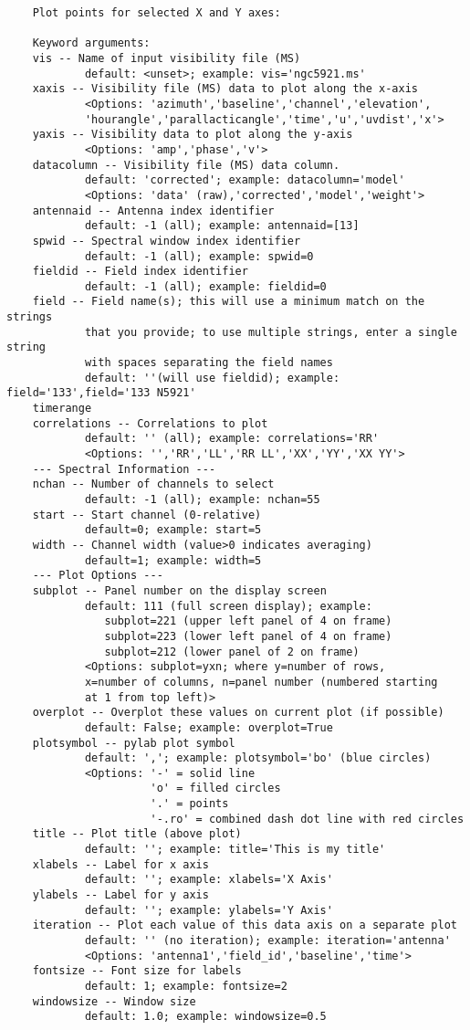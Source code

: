 \small
\begin{verbatim}
    Plot points for selected X and Y axes:
    
    Keyword arguments:
    vis -- Name of input visibility file (MS)
            default: <unset>; example: vis='ngc5921.ms'
    xaxis -- Visibility file (MS) data to plot along the x-axis
            <Options: 'azimuth','baseline','channel','elevation',
            'hourangle','parallacticangle','time','u','uvdist','x'>
    yaxis -- Visibility data to plot along the y-axis
            <Options: 'amp','phase','v'>
    datacolumn -- Visibility file (MS) data column.
            default: 'corrected'; example: datacolumn='model'
            <Options: 'data' (raw),'corrected','model','weight'>
    antennaid -- Antenna index identifier
            default: -1 (all); example: antennaid=[13]
    spwid -- Spectral window index identifier
            default: -1 (all); example: spwid=0
    fieldid -- Field index identifier
            default: -1 (all); example: fieldid=0
    field -- Field name(s); this will use a minimum match on the strings
            that you provide; to use multiple strings, enter a single string
            with spaces separating the field names
            default: ''(will use fieldid); example: field='133',field='133 N5921'
    timerange
    correlations -- Correlations to plot
            default: '' (all); example: correlations='RR'
            <Options: '','RR','LL','RR LL','XX','YY','XX YY'>
    --- Spectral Information ---
    nchan -- Number of channels to select
            default: -1 (all); example: nchan=55
    start -- Start channel (0-relative)
            default=0; example: start=5
    width -- Channel width (value>0 indicates averaging)
            default=1; example: width=5
    --- Plot Options ---
    subplot -- Panel number on the display screen
            default: 111 (full screen display); example:
               subplot=221 (upper left panel of 4 on frame)
               subplot=223 (lower left panel of 4 on frame)
               subplot=212 (lower panel of 2 on frame)
            <Options: subplot=yxn; where y=number of rows,
            x=number of columns, n=panel number (numbered starting
            at 1 from top left)>
    overplot -- Overplot these values on current plot (if possible)
            default: False; example: overplot=True
    plotsymbol -- pylab plot symbol
            default: ','; example: plotsymbol='bo' (blue circles)
            <Options: '-' = solid line
                      'o' = filled circles
                      '.' = points
                      '-.ro' = combined dash dot line with red circles
    title -- Plot title (above plot)
            default: ''; example: title='This is my title'
    xlabels -- Label for x axis
            default: ''; example: xlabels='X Axis'
    ylabels -- Label for y axis
            default: ''; example: ylabels='Y Axis'
    iteration -- Plot each value of this data axis on a separate plot
            default: '' (no iteration); example: iteration='antenna'
            <Options: 'antenna1','field_id','baseline','time'>
    fontsize -- Font size for labels
            default: 1; example: fontsize=2
    windowsize -- Window size
            default: 1.0; example: windowsize=0.5
\end{verbatim}
\normalsize


